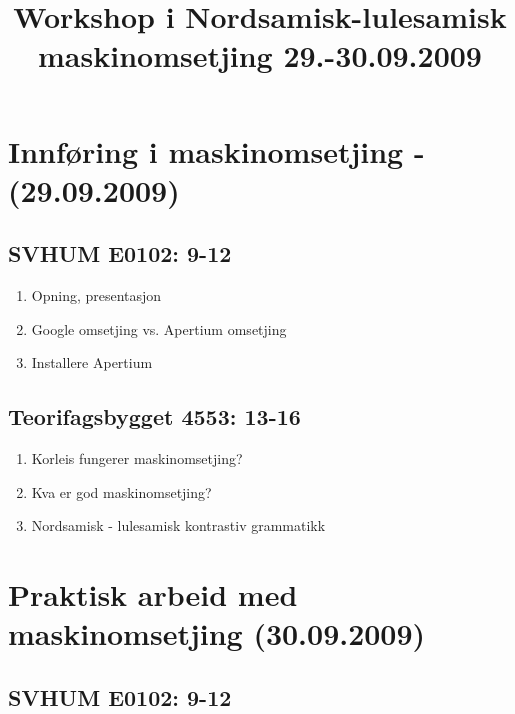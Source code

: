 \documentclass[a4paper,english,12pt]{article}
\begin{document}
\setcounter{secnumdepth}{3}
\setcounter{tocdepth}{3}
\begin{spacing}{0.8}


\newcommand{\tx}{\mbox{t\hspace{-.35em}-}} %




\title{Workshop i Nordsamisk-lulesamisk maskinomsetjing 29.-30.09.2009}

\maketitle

\section{Innføring i maskinomsetjing - (29.09.2009)}


\subsection{SVHUM E0102: 9-12}
\begin{enumerate}
\item Opning, presentasjon 
\item Google omsetjing vs. Apertium omsetjing
\item Installere Apertium  %
\end{enumerate}

\subsection{Teorifagsbygget 4553: 13-16}

\begin{enumerate}
\item Korleis fungerer maskinomsetjing?  %
\item Kva er god maskinomsetjing? 
\item Nordsamisk - lulesamisk kontrastiv grammatikk 
\end{enumerate}


\section{Praktisk arbeid med maskinomsetjing  (30.09.2009)}

\subsection{SVHUM E0102: 9-12}


\end{spacing}
\end{document}
